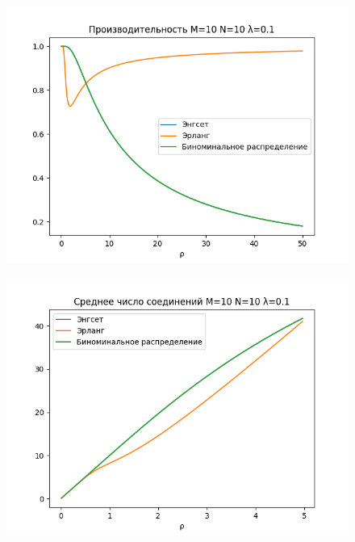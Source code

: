 \documentclass[12pt]{article}
\begin{document}
\begin{figure}[!htb]
\centering
\includegraphics[scale=1.00]{assets/iss_3/perf_M10_N10_lam01.png}
\caption{}
\label{}
\end{figure}

\begin{figure}[!htb]
\centering
\includegraphics[scale=1.00]{assets/iss_3/aver_conn_M10_N10_lam01.png}
\caption{}
\label{}
\end{figure}
\end{document}
